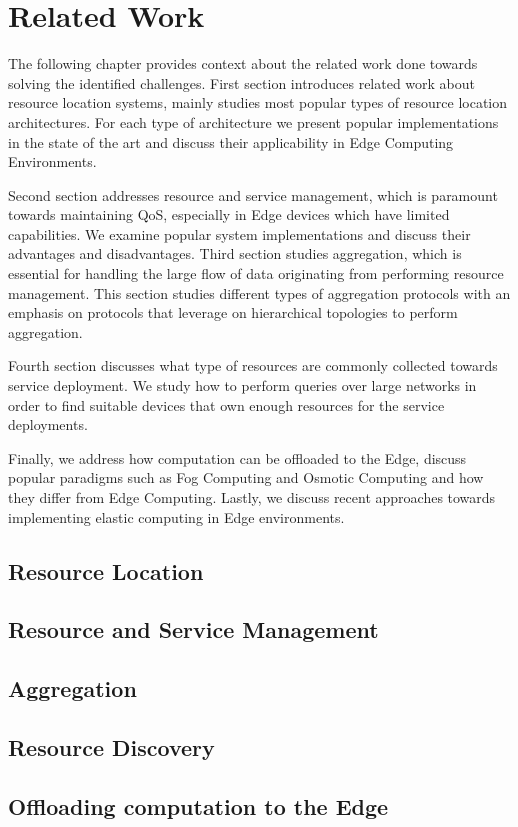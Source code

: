 \chapter{Related Work} \label{cha:related_work}

The following chapter provides context about the related work done towards solving the identified challenges. First section introduces related work about resource location systems, mainly studies most popular types of resource location architectures. For each type of architecture we present popular implementations in the state of the art and discuss their applicability in Edge Computing Environments. 

Second section addresses resource and service management, which is paramount towards maintaining QoS, especially in Edge devices which have limited capabilities. We examine popular system implementations and discuss their advantages and disadvantages. Third section studies aggregation, which is essential for handling the large flow of data originating from performing resource management. This section studies different types of aggregation protocols with an emphasis on protocols that leverage on hierarchical topologies to perform aggregation.

Fourth section discusses what type of resources are commonly collected towards service deployment. We study how to perform queries over large networks in order to find suitable devices that own enough resources for the service deployments. 

Finally, we address how computation can be offloaded to the Edge, discuss popular paradigms such as Fog Computing and Osmotic Computing and how they differ from Edge Computing. Lastly, we discuss  recent approaches towards implementing elastic computing in Edge environments.

\section{Resource Location} \label{sec:res_location} 

\section{Resource and Service Management} \label{sec:res_management} 

\section{Aggregation} \label{sec:aggregation} 

\section{Resource Discovery} \label{sec:res_discovery} 

\section{Offloading computation to the Edge} \label{sec:offloading_computation} 

